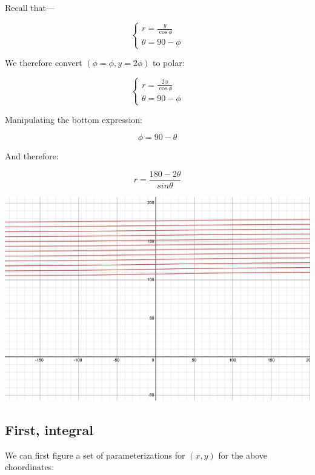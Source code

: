 \documentclass[letterpaper]{article}
\begin{document}
Recall that---

\begin{equation}
\begin{cases}
   r = \frac{y}{\cos\phi} \\
   \theta = 90-\phi 
\end{cases}
\end{equation}

We therefore convert \((\phi=\phi, y=2\phi)\) to polar:

\begin{equation}
\begin{cases}
r = \frac{2\phi}{\cos\phi}\\
\theta = 90-\phi
\end{cases}
\end{equation}

Manipulating the bottom expression:

\begin{equation}
   \phi = 90-\theta 
\end{equation}

And therefore:

\begin{equation}
   r = \frac{180-2\theta}{sin\theta} 
\end{equation}

\begin{center}
\includegraphics[width=.9\linewidth]{2022-06-01_10-38-51_screenshot.png}
\end{center}

\subsection{First, integral}
\label{sec:orgbcf3b3a}
We can first figure a set of parameterizations for \((x,y)\) for the above choordinates:
\end{document}
